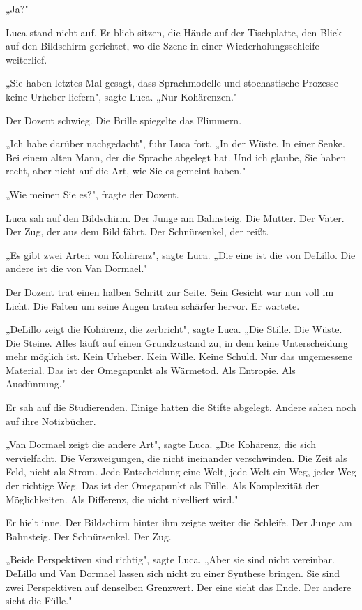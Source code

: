 \documentclass[
  ngerman,
]{article}
\begin{document}
„Ja?"

Luca stand nicht auf. Er blieb sitzen, die Hände auf der Tischplatte,
den Blick auf den Bildschirm gerichtet, wo die Szene in einer
Wiederholungsschleife weiterlief.

„Sie haben letztes Mal gesagt, dass Sprachmodelle und stochastische
Prozesse keine Urheber liefern", sagte Luca. „Nur Kohärenzen."

Der Dozent schwieg. Die Brille spiegelte das Flimmern.

„Ich habe darüber nachgedacht", fuhr Luca fort. „In der Wüste. In einer
Senke. Bei einem alten Mann, der die Sprache abgelegt hat. Und ich
glaube, Sie haben recht, aber nicht auf die Art, wie Sie es gemeint
haben."

„Wie meinen Sie es?", fragte der Dozent.

Luca sah auf den Bildschirm. Der Junge am Bahnsteig. Die Mutter. Der
Vater. Der Zug, der aus dem Bild fährt. Der Schnürsenkel, der reißt.

„Es gibt zwei Arten von Kohärenz", sagte Luca. „Die eine ist die von
DeLillo. Die andere ist die von Van Dormael."

Der Dozent trat einen halben Schritt zur Seite. Sein Gesicht war nun
voll im Licht. Die Falten um seine Augen traten schärfer hervor. Er
wartete.

„DeLillo zeigt die Kohärenz, die zerbricht", sagte Luca. „Die Stille.
Die Wüste. Die Steine. Alles läuft auf einen Grundzustand zu, in dem
keine Unterscheidung mehr möglich ist. Kein Urheber. Kein Wille. Keine
Schuld. Nur das ungemessene Material. Das ist der Omegapunkt als
Wärmetod. Als Entropie. Als Ausdünnung."

Er sah auf die Studierenden. Einige hatten die Stifte abgelegt. Andere
sahen noch auf ihre Notizbücher.

„Van Dormael zeigt die andere Art", sagte Luca. „Die Kohärenz, die sich
vervielfacht. Die Verzweigungen, die nicht ineinander verschwinden. Die
Zeit als Feld, nicht als Strom. Jede Entscheidung eine Welt, jede Welt
ein Weg, jeder Weg der richtige Weg. Das ist der Omegapunkt als Fülle.
Als Komplexität der Möglichkeiten. Als Differenz, die nicht nivelliert
wird."

Er hielt inne. Der Bildschirm hinter ihm zeigte weiter die Schleife. Der
Junge am Bahnsteig. Der Schnürsenkel. Der Zug.

„Beide Perspektiven sind richtig", sagte Luca. „Aber sie sind nicht
vereinbar. DeLillo und Van Dormael lassen sich nicht zu einer Synthese
bringen. Sie sind zwei Perspektiven auf denselben Grenzwert. Der eine
sieht das Ende. Der andere sieht die Fülle."
\end{document}
